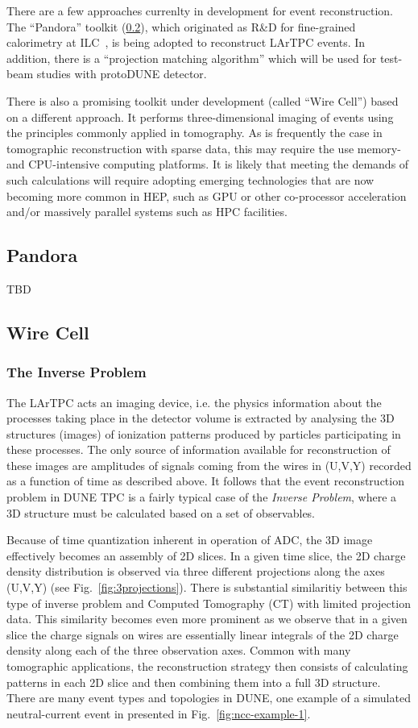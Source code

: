 There are a few approaches currenlty in development for event reconstruction. The ``Pandora'' toolkit (\ref{sec:wirecell}), which
originated as R\&D for fine-grained calorimetry at ILC~\cite{pandora}, is being adopted to reconstruct LArTPC events.
In addition, there is a ``projection matching algorithm'' which will be used for test-beam studies with protoDUNE detector.

There is also a promising toolkit under development (called ``Wire Cell'') based on a different approach.
It performs three-dimensional imaging of events using the principles commonly applied in tomography.
As is frequently the case in tomographic reconstruction with sparse data, this may require the use memory- and CPU-intensive computing platforms.
It is likely that meeting the demands of such calculations will require adopting emerging technologies that are now becoming more common in
HEP, such as GPU or other co-processor acceleration and/or massively parallel systems such as HPC facilities.

\subsection{Pandora}
\label{sec:pandora}
TBD


\subsection{Wire Cell}
\label{sec:wirecell}
\subsubsection{The Inverse Problem}

The LArTPC acts an imaging device, i.e. the physics information about the processes taking place in the detector volume is extracted by
analysing the 3D structures (images) of ionization patterns produced by particles participating in these processes. The only source of information
available for reconstruction of these images are amplitudes of signals coming from the wires in (U,V,Y) recorded as a function of time
as described above. It follows that the event reconstruction problem in DUNE TPC is a fairly typical case of the \textit{Inverse Problem},
where a 3D structure must be calculated based on a set of observables.

Because of time quantization inherent in operation of ADC, the 3D image effectively becomes an assembly of 2D slices.
In a given time slice, the 2D charge density distribution is observed via three different projections along the axes (U,V,Y) (see Fig.~\ref{fig:3projections}).
There is substantial similaritiy between this type of inverse problem and Computed Tomography (CT) with limited projection data. This similarity becomes even more prominent as we observe that in a
given slice the charge signals on wires are essentially linear integrals of the 2D charge density along each of the three observation axes. Common with many tomographic applications, the reconstruction strategy
then consists of calculating patterns in each 2D slice and then combining them into a full 3D structure. There are many event types and topologies
in DUNE, one example of a simulated neutral-current event in presented in Fig.~\ref{fig:ncc-example-1}.

